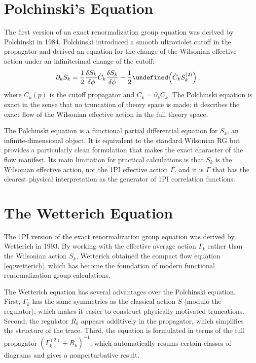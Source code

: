 \documentclass[11pt, twoside, openright]{book}
\theoremstyle{dotted}
\theoremstyle{definition}
\newcommand{\Gk}{\Gamma_k}             %
\newcommand{\Gktwo}{\Gamma_k^{(2)}}   %
\newcommand{\Rk}{R_k}                  %
\let\tr\undefined
\DeclareMathOperator{\tr}{Tr}          %
\begin{document}
\section{Polchinski's Equation}

The first version of an exact renormalization group equation was derived by
Polchinski in 1984. Polchinski introduced a smooth ultraviolet cutoff in the
propagator and derived an equation for the change of the Wilsonian effective action
under an infinitesimal change of the cutoff:
\begin{equation}
  \partial_k S_k = \frac{1}{2}\frac{\delta S_k}{\delta\phi}\dot C_k
  \frac{\delta S_k}{\delta\phi} - \frac{1}{2}\tr\!\left(\dot C_k S_k^{(2)}\right),
  \label{eq:polchinski}
\end{equation}
where $C_k(p)$ is the cutoff propagator and $\dot C_k = \partial_k C_k$. The
Polchinski equation is exact in the sense that no truncation of theory space is
made; it describes the exact flow of the Wilsonian effective action in the full
theory space.

The Polchinski equation is a functional partial differential equation for $S_k$,
an infinite-dimensional object. It is equivalent to the standard Wilsonian RG but
provides a particularly clean formulation that makes the exact character of the
flow manifest. Its main limitation for practical calculations is that $S_k$ is the
Wilsonian effective action, not the 1PI effective action $\Gamma$, and it is $\Gamma$
that has the clearest physical interpretation as the generator of 1PI correlation
functions.

\section{The Wetterich Equation}

The 1PI version of the exact renormalization group equation was derived by Wetterich
in 1993. By working with the effective average action $\Gk$ rather than the
Wilsonian action $S_k$, Wetterich obtained the compact flow equation
\eqref{eq:wetterich}, which has become the foundation of modern functional
renormalization group calculations.

The Wetterich equation has several advantages over the Polchinski equation. First,
$\Gk$ has the same symmetries as the classical action $S$ (modulo the regulator),
which makes it easier to construct physically motivated truncations. Second, the
regulator $\Rk$ appears additively in the propagator, which simplifies the structure
of the trace. Third, the equation is formulated in terms of the full propagator
$(\Gktwo + \Rk)^{-1}$, which automatically resums certain classes of diagrams and
gives a nonperturbative result.
\end{document}
